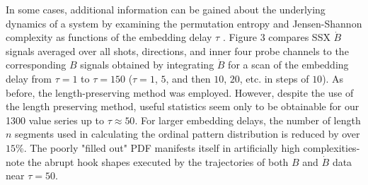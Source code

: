 \documentclass[aps,twocolumn,secnumarabic,nobalancelastpage,amsmath,amssymb,
nofootinbib]{revtex4-1}
\begin{document}
In some cases, additional information can be gained about the underlying dynamics of a system by examining the permutation entropy and Jensen-Shannon complexity as functions of the embedding delay $\tau$ \cite{zunino2012}. Figure 3 compares SSX $\dot{B}$ signals averaged over all shots, directions, and inner four probe channels to the corresponding $B$ signals obtained by integrating $\dot{B}$ for a scan of the embedding delay from $\tau=1$ to $\tau=150$ ($\tau=1$, $5$, and then $10$, $20$, etc. in steps of $10$). As before, the length-preserving method was employed. However, despite the use of the length preserving method, useful statistics seem only to be obtainable for our 1300 value series up to $\tau \approx 50$. For larger embedding delays, the number of length $n$ segments used in calculating the ordinal pattern distribution is reduced by over $15$\%. The poorly "filled out" PDF manifests itself in artificially high complexities-  note the abrupt hook shapes executed by the trajectories of both $B$ and $\dot{B}$ data near $\tau=50$. 
\end{document}
